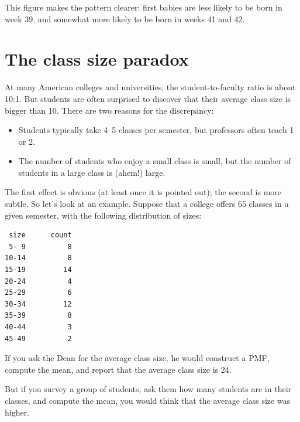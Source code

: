 \documentclass[12pt]{book}
\begin{document}
This figure makes the pattern clearer: first babies are
less likely to be born in week 39, and somewhat more likely
to be born in weeks 41 and 42.


\section{The class size paradox}

At many American colleges and universities, the student-to-faculty
ratio is about 10:1.  But students are often surprised to discover
that their average class size is bigger than 10.  There
are two reasons for the discrepancy:

\begin{itemize}

\item Students typically take 4--5 classes per semester, but
professors often teach 1 or 2.

\item The number of students who enjoy a small class is small,
but the number of students in a large class is (ahem!) large.

\end{itemize}

The first effect is obvious (at least once it is pointed out);
the second is more subtle.  So let's look at an example.  Suppose
that a college offers 65 classes in a given semester, with the
following distribution of sizes:
%
\begin{verbatim}
 size      count
 5- 9          8
10-14          8
15-19         14
20-24          4
25-29          6
30-34         12
35-39          8
40-44          3
45-49          2
\end{verbatim}

If you ask the Dean for the average class size, he would
construct a PMF, compute the mean, and report that the
average class size is 24.

But if you survey a group of students, ask them how many
students are in their classes, and compute the mean, you would
think that the average class size was higher.
\end{document}
